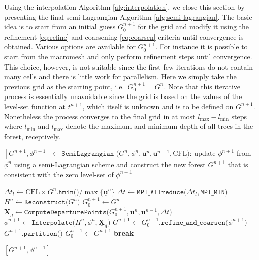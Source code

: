 Using the interpolation Algorithm \ref{alg:interpolation}, we close this section by presenting the final semi-Lagrangian Algorithm \ref{alg:semi-lagrangian}. The basic idea is to start from an initial guess $G^{n+1}_0$ for the grid and modify it using the refinement \eqref{eq:refine} and coarsening \eqref{eq:coarsen} criteria until convergence is obtained. Various options are available for $G^{n+1}_0$. For instance it is possible to start from the macromesh and only perform refinement steps until convergence. This choice, however, is not suitable since the first few iterations do not contain many cells and there is little work for parallelism. Here we simply take the previous grid as the starting point, i.e.\ $G^{n+1}_0 = G^n$. Note that this iterative process is essentially unavoidable since the grid is based on the values of the level-set function at $t^{n+1}$, which itself is unknown and is to be defined on $G^{n+1}$. Nonetheless the process converges to the final grid in at most $l_{\max}-l_{\min}$ steps where $l_{\min}$ and $l_{\max}$ denote the maximum and minimum depth of all trees in the forest, receptively.
\begin{algorithm}[htbp]
\caption{$[G^{n+1}, \phi^{n+1}] \gets \texttt{SemiLagrangian (}G^n, \phi^n, \underline{\mathbf{u}}^n, \underline{\mathbf{u}}^{n-1}, \text{CFL}\texttt{)}$: update $\phi^{n+1}$ from $\phi^n$ using a semi-Lagrangian scheme and construct the new forest $G^{n+1}$ that is consistent with the zero level-set of $\phi^{n+1}$}
\begin{algorithmic}[1]
\State $\Delta t_l \gets \text{CFL} \times G^n.\texttt{hmin()} / \max \{\underline{\mathbf{u}}^n \} $
\State $\Delta t   \gets \texttt{MPI\_Allreduce(}\Delta t_l,\texttt{MPI\_MIN)}$ 
\State $H^n \gets \texttt{Reconstruct(} G^n\texttt{)}$  
\State $G^{n+1}_0 \gets G^n$
	\State $\underline{\mathbf{X}}_d  \gets \texttt{ComputeDeparturePoints(}G^{n+1}_0, \underline{\mathbf{u}}^n, \underline{\mathbf{u}}^{n-1}, \Delta t\texttt{)}$ 
	\State $\phi^{n+1} \gets \texttt{Interpolate(}H^n, \phi^n, \underline{\textbf{X}}_d\texttt{)}$ 
	\State $G^{n+1} \gets G^{n+1}_0.\texttt{refine\_and\_coarsen(}\phi^{n+1}\texttt{)}$ 
		\State $G^{n+1}.\texttt{partition()}$
		\State $G^{n+1}_0 \gets G^{n+1}$
	\Else
		\State \textbf{break}
	\EndIf
\EndWhile

\State \Return $[G^{n+1}, \phi^{n+1}]$
\end{algorithmic}
\label{alg:semi-lagrangian}
\end{algorithm}

